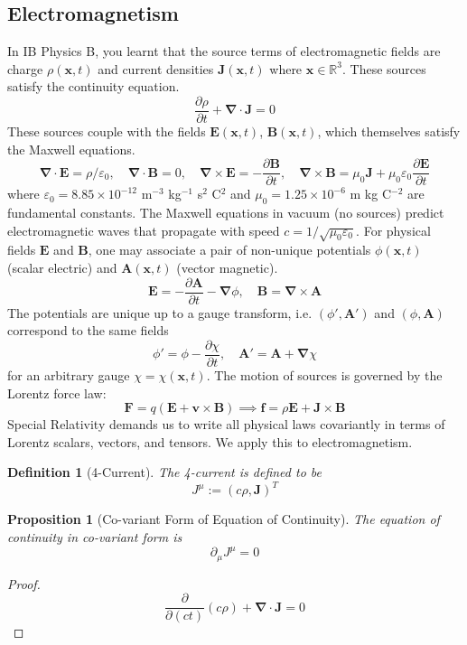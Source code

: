 \documentclass[a4paper]{article}
\theoremstyle{new}
\newtheorem{defi}{Definition}[section]
\newtheorem{prop}{Proposition}[section]
\begin{document}
\subsection{Electromagnetism}
In IB Physics B, you learnt that the source terms of electromagnetic fields are charge $\rho(\mathbf{x},t)$ and current densities $\mathbf{J}(\mathbf{x},t)$ where $\mathbf{x}\in\mathbb{R}^3$. These sources satisfy the continuity equation.
$$\frac{\partial\rho}{\partial t}+\boldsymbol{\nabla}\cdot\mathbf{J}=0$$
These sources couple with the fields $\mathbf{E}(\mathbf{x},t)$, $\mathbf{B}(\mathbf{x},t)$, which themselves satisfy the Maxwell equations.
$$\boldsymbol{\nabla}\cdot\mathbf{E}=\rho/\varepsilon_0,\quad\boldsymbol{\nabla}\cdot\mathbf{B}=0,\quad\boldsymbol{\nabla}\times\mathbf{E}=-\frac{\partial\mathbf{B}}{\partial t},\quad\boldsymbol{\nabla}\times\mathbf{B}=\mu_0\mathbf{J}+\mu_0\varepsilon_0\frac{\partial\mathbf{E}}{\partial t}$$
where $\varepsilon_0=8.85\times10^{-12}$ m$^{-3}$ kg$^{-1}$ s$^2$ C$^2$ and $\mu_0=1.25\times10^{-6}$ m kg C$^{-2}$ are fundamental constants. The Maxwell equations in vacuum (no sources) predict electromagnetic waves that propagate with speed $c=1/\sqrt{\mu_0\varepsilon_0}$. For physical fields $\mathbf{E}$ and $\mathbf{B}$, one may associate a pair of non-unique potentials $\phi(\mathbf{x},t)$ (scalar electric) and $\mathbf{A}(\mathbf{x},t)$ (vector magnetic). 
$$\mathbf{E}=-\frac{\partial\mathbf{A}}{\partial t}-\boldsymbol{\nabla}\phi,\quad\mathbf{B}=\boldsymbol{\nabla}\times\mathbf{A}$$
The potentials are unique up to a gauge transform, i.e.  $(\phi',\mathbf{A'})$ and $(\phi,\mathbf{A})$ correspond to the same fields
$$\phi'=\phi-\frac{\partial\chi}{\partial t},\quad\mathbf{A'}=\mathbf{A}+\boldsymbol{\nabla}\chi$$
for an arbitrary gauge $\chi=\chi(\mathbf{x},t)$. The motion of sources is governed by the Lorentz force law:
$$\mathbf{F}=q(\mathbf{E}+\mathbf{v}\times\mathbf{B})\implies\mathbf{f}=\rho\mathbf{E}+\mathbf{J}\times\mathbf{B}$$
Special Relativity demands us to write all physical laws covariantly in terms of Lorentz scalars, vectors, and tensors. We apply this to electromagnetism.
\begin{defi}[4-Current]
The 4-current is defined to be
$$J^\mu:=(c\rho,\mathbf{J})^T$$
\end{defi}
\begin{prop}[Co-variant Form of Equation of Continuity]
The equation of continuity in co-variant form is
$$\partial_\mu J^\mu=0$$
\end{prop}
\begin{proof}
$$\frac{\partial}{\partial(ct)}(c\rho)+\boldsymbol{\nabla}\cdot\mathbf{J}=0$$
\end{proof}
\end{document}
